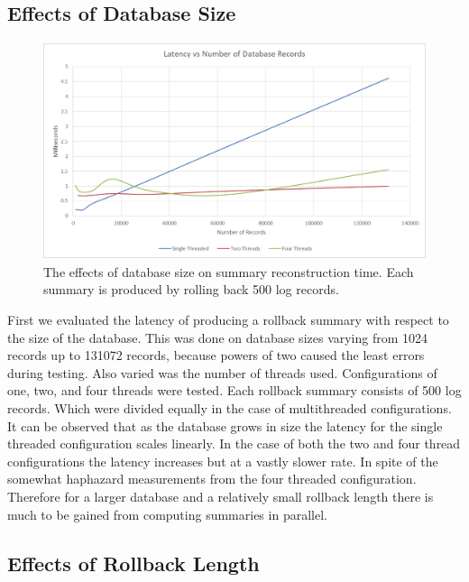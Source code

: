 \documentclass{article}
\begin{document}

\subsection{Effects of Database Size}
\begin{figure}
    \centering
    \includegraphics[height=2.5in]{latencyvsrecords.png}
    \caption{The effects of database size on summary reconstruction time. Each summary is produced by rolling back 500 log records.}
    \label{fig:DatabaseSize}
\end{figure}

First we evaluated the latency of producing a rollback summary with respect to the size of the database. This was done on database sizes varying from 1024 records up to 131072 records, because powers of two caused the least errors during testing. Also varied was the number of threads used. Configurations of one, two, and four threads were tested. Each rollback summary consists of 500 log records. Which were divided equally in the case of multithreaded configurations. It can be observed that as the database grows in size the latency for the single threaded configuration scales linearly. In the case of both the two and four thread configurations the latency increases but at a vastly slower rate. In spite of the somewhat haphazard measurements from the four threaded configuration. Therefore for a larger database and a relatively small rollback length there is much to be gained from computing summaries in parallel.

\subsection{Effects of Rollback Length}
\end{document}

